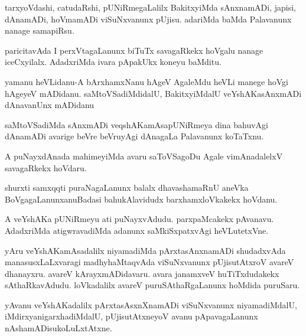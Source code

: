 \documentclass{article}
\begin{document}
\begin{mn}%
tarxyoVdashi, catudaRshi, pUNiRmegaLalilx BakitxyiMda sAnxnamADi, japisi, dAnamADi, 
hoVmamADi viSuNxvanunx pUjisu. adariMda baMda Palavanunx nanage samapiRsu. 
\end{mn}

\begin{mn}%
paricitavAda I perxVtagaLanunx biTuTx savagaRkekx hoVgalu nanage iceCxyilalx. AdadxriMda 
ivara pApakUkx koneyu baMditu.
\end{mn}

\begin{mn}%
yamanu heVLidanu-A bArxhamxNanu hAgeV AgaleMdu heVLi manege hoVgi hAgeyeV mADidanu. 
saMtoVSadiMdidalU, BakitxyiMdalU veYshAKasAnxmADi dAnavanUnx mADidanu
\end{mn}

\begin{mn}%
saMtoVSadiMda sAnxmADi veqshAKamAsapUNiRmeya dina bahuvAgi dAnamADi avarige beVre 
beVruyAgi dAnagaLa Palavanunx koTaTxnu.
\end{mn}

\begin{mn}%
A puNayxdAnada mahimeyiMda avaru saToVSagoDu Agale vimAnadalelxV savagaRkekx hoVdaru.
\end{mn}

\begin{mn}%
shurxti samxqqti puraNagaLanunx balalx dhavashamaRnU aneVka BoVgagaLanunxanuBadasi 
bahukAlavidudx barxhamxloVkakekx hoVdanu.
\end{mn}

\begin{mn}%
A veYshAKa pUNiRmeyu ati puNayxvAdudu. parxpaMcakekx pAvanavu. AdadxriMda atigwravadiMda 
adanunx saMkiSxpatxvAgi heVLutetxVne.
\end{mn}

\begin{mn}%
yAru veYshAKamAsadalilx niyamadiMda pArxtasAnxnamADi shudadxvAda manasusxLaLxvaragi 
madhyhaMtaqvAda viSuNxvanunx pUjisutAtxroV avareV dhanayxru. avareV kArayxmADidavaru. 
avara janamxveV huTiTxdudakekx sAthaRkavAdudu. loVkadalilx avareV puruSAthaRgaLanunx 
hoMdida puruSaru.
\end{mn}

\begin{mn}%
yAvanu veYshAKadalilx pArxtasAsxnXnamADi viSuNxvanunx niyamadiMdalU, 
iMdirxyanigarxhadiMdalU, pUjisutAtxneyoV avanu pApavagaLanunx nAshamADisukoLuLxtAtxne.
\end{mn}
\end{document}
